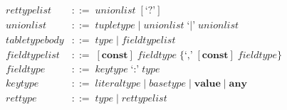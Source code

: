 \begin{align*}
\textit{rettypelist} & ::= \; \textit{unionlist} \; [\texttt{`?'}]\\
\textit{unionlist} & ::= \; \textit{tupletype} \; | \;
  \textit{unionlist} \; \texttt{`|'} \; \textit{unionlist}\\
\textit{tabletypebody} & ::= \; \textit{type} \; | \; \textit{fieldtypelist}\\
\textit{fieldtypelist} & ::= \; [\textbf{const}] \; \textit{fieldtype} \; \{\texttt{`,'} \; [\textbf{const}] \; \textit{fieldtype}\}\\ 
\textit{fieldtype} & ::= \; \textit{keytype} \; \texttt{`:'} \; \textit{type}\\
\textit{keytype} & ::= \; \textit{literaltype} \; | \;
  \textit{basetype} \; | \;
  \textbf{value} \; | \;
  \textbf{any}\\
\textit{rettype} & ::= \; \textit{type} \; | \; \textit{rettypelist}\\
\end{align*}
